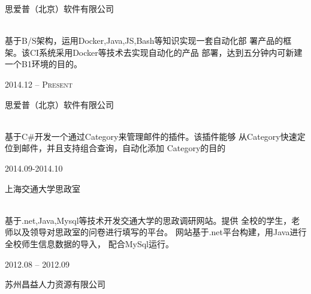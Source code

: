 \documentclass[10pt]{article} %
\begin{document}
{\begin{minipage}[t]{0.5\textwidth}
{\raggedright\large 思爱普（北京）软件有限公司\\[8pt] 

\\[8pt]}

\normalsize{
基于B\//S架构，运用Docker,Java,JS,Bash等知识实现一套自动化部
署产品的框架。该CI系统采用Docker等技术去实现自动化的产品
部署，达到五分钟内可新建一个B1环境的目的。}\\


{\raggedleft\textsc{2014.12 -- Present}\par}

{\raggedright\large 思爱普（北京）软件有限公司\\[8pt]

\\[8pt]}

\normalsize{
基于C\#开发一个通过Category来管理邮件的插件。该插件能够
从Category快速定位到邮件，并且支持组合查询，自动化添加
Category的目的}\\


{\raggedleft\textsc{2014.09-2014.10}\par}

{\raggedright\large 上海交通大学思政室\\[8pt]

\\[8pt]}

\normalsize{
基于.net,Java,Mysql等技术开发交通大学的思政调研网站。提供
全校的学生，老师以及领导对思政室的问卷进行填写的平台。
网站基于.net平台构建，用Java进行全校师生信息数据的导入，
配合MySql运行。}\\


{\raggedleft\textsc{2012.08 -- 2012.09}\par}

{\raggedright\large 苏州昌益人力资源有限公司\\[8pt] 

\\[8pt]}


\end{minipage}}
\end{document}

